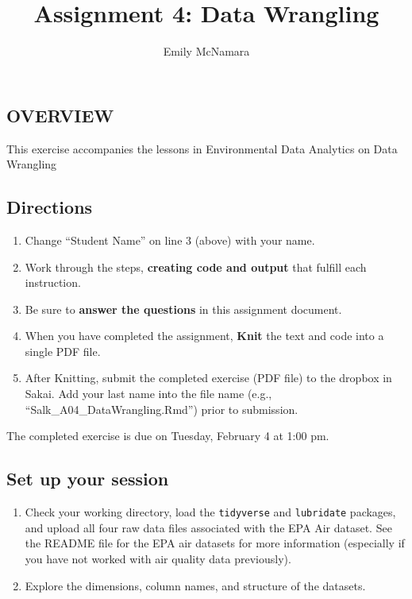 \documentclass[]{article}
\title{Assignment 4: Data Wrangling}
\author{Emily McNamara}
\date{}
\providecommand{\tightlist}{%
  \setlength{\itemsep}{0pt}\setlength{\parskip}{0pt}}
\begin{document}
\maketitle

\subsection{OVERVIEW}\label{overview}

This exercise accompanies the lessons in Environmental Data Analytics on
Data Wrangling

\subsection{Directions}\label{directions}

\begin{enumerate}
\def\labelenumi{\arabic{enumi}.}
\tightlist
\item
  Change ``Student Name'' on line 3 (above) with your name.
\item
  Work through the steps, \textbf{creating code and output} that fulfill
  each instruction.
\item
  Be sure to \textbf{answer the questions} in this assignment document.
\item
  When you have completed the assignment, \textbf{Knit} the text and
  code into a single PDF file.
\item
  After Knitting, submit the completed exercise (PDF file) to the
  dropbox in Sakai. Add your last name into the file name (e.g.,
  ``Salk\_A04\_DataWrangling.Rmd'') prior to submission.
\end{enumerate}

The completed exercise is due on Tuesday, February 4 at 1:00 pm.

\subsection{Set up your session}\label{set-up-your-session}

\begin{enumerate}
\def\labelenumi{\arabic{enumi}.}
\item
  Check your working directory, load the \texttt{tidyverse} and
  \texttt{lubridate} packages, and upload all four raw data files
  associated with the EPA Air dataset. See the README file for the EPA
  air datasets for more information (especially if you have not worked
  with air quality data previously).
\item
  Explore the dimensions, column names, and structure of the datasets.
\end{enumerate}
\end{document}
